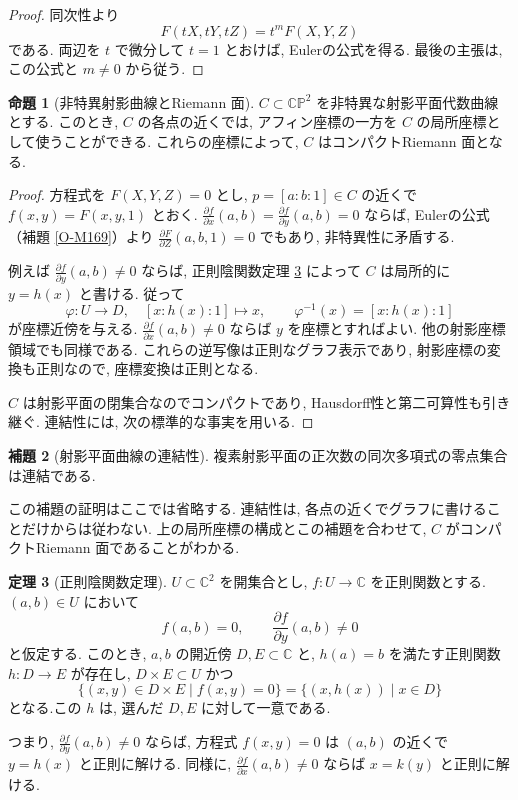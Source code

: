 \documentclass[dvipdfmx,a4paper,11pt]{article} %
\newcommand{\C}{\mathbb{C}}
\theoremstyle{definition}
\newtheorem{thm}{定理}[section]
\numberwithin{equation}{section}
\newtheorem{lem}[thm]{補題}
\newtheorem{prop}[thm]{命題}
\begin{document}
\begin{proof}
同次性より
\[
F(tX,tY,tZ)=t^mF(X,Y,Z)
\]
である.
両辺を $t$ で微分して $t=1$ とおけば, 
Eulerの公式を得る.
最後の主張は, この公式と $m\neq0$ から従う.
\end{proof}

\begin{prop}[非特異射影曲線とRiemann 面]
$C\subset\C\mathbb P^2$ を非特異な射影平面代数曲線とする.
このとき, $C$ の各点の近くでは, アフィン座標の一方を
$C$ の局所座標として使うことができる.
これらの座標によって, $C$ はコンパクトRiemann 面となる.
\end{prop}

\begin{proof}
方程式を $F(X,Y,Z)=0$ とし, $p=[a:b:1]\in C$ の近くで
$f(x,y)=F(x,y,1)$ とおく.
$\frac{\partial f}{\partial x}(a,b)=\frac{\partial f}{\partial y}(a,b)=0$ ならば,
Eulerの公式（補題 \ref{O-M169}）より $\frac{\partial F}{\partial Z}(a,b,1)=0$ でもあり,
非特異性に矛盾する.

例えば $\frac{\partial f}{\partial y}(a,b)\neq0$ ならば,
正則陰関数定理 \ref{thm-holomorphic-implicit} によって
$C$ は局所的に $y=h(x)$ と書ける.
従って
\[
\varphi:U\longrightarrow D,\quad [x:h(x):1]\longmapsto x,
\qquad
\varphi^{-1}(x)=[x:h(x):1]
\]
が座標近傍を与える. $\frac{\partial f}{\partial x}(a,b)\neq0$ ならば $y$ を座標とすればよい.
他の射影座標領域でも同様である.
これらの逆写像は正則なグラフ表示であり,
射影座標の変換も正則なので, 座標変換は正則となる.

$C$ は射影平面の閉集合なのでコンパクトであり,
Hausdorff性と第二可算性も引き継ぐ.
連結性には, 次の標準的な事実を用いる.
\end{proof}
\begin{lem}[射影平面曲線の連結性]\label{lem-plane-curve-connected}
複素射影平面の正次数の同次多項式の零点集合は連結である.
\end{lem}
この補題の証明はここでは省略する.
連結性は, 各点の近くでグラフに書けることだけからは従わない.
上の局所座標の構成とこの補題を合わせて,
$C$ がコンパクトRiemann 面であることがわかる.

\begin{thm}[正則陰関数定理]\label{thm-holomorphic-implicit}
$U\subset\C^2$ を開集合とし, $f:U\to\C$ を正則関数とする.
$(a,b)\in U$ において
\[
f(a,b)=0,\qquad
\frac{\partial f}{\partial y}(a,b)\neq0
\]
と仮定する.
このとき, $a,b$ の開近傍 $D,E\subset\C$ と, 
$h(a)=b$ を満たす正則関数 $h:D\to E$ が存在し, 
$D\times E\subset U$ かつ
\[
\{(x,y)\in D\times E\mid f(x,y)=0\}
=\{(x,h(x))\mid x\in D\}
\]
となる.この $h$ は, 選んだ $D,E$ に対して一意である.

つまり, $\frac{\partial f}{\partial y}(a,b)\neq0$ ならば, 
方程式 $f(x,y)=0$ は $(a,b)$ の近くで
$y=h(x)$ と正則に解ける.
同様に, $\frac{\partial f}{\partial x}(a,b)\neq0$ ならば $x=k(y)$ と正則に解ける.
\end{thm}
\end{document}
